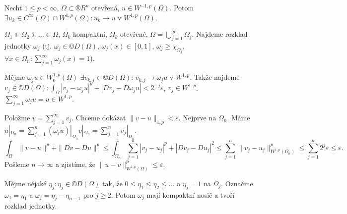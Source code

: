 \documentclass[12pt]{article}					%
\begin{document}
\begin{veta}
	Nechť $1 ≤ p < ∞$, $Ω \subset ®R^n$ otevřená, $u \in W^{-1, p}(Ω)$. Potom $\exists u_k \in C^∞(Ω) \cap W^{1, p}(Ω): u_k \rightarrow u$ v $W^{1, p}(Ω)$.

	\begin{dukazin}
		$Ω_1 \Subset Ω_2 \Subset … \Subset Ω$, $\overline{Ω_k}$ kompaktní, $Ω_k$ otevřené, $Ω = \bigcup_{j=1}^∞ Ω_j$. Najdeme rozklad jednotky $ω_j$ (tj. $ω_j \in ©D(Ω)$, $ω_j(x) \in [0, 1]$, $ω_j ≥ χ_{Ω_j}$, $\forall x \in Ω_n: \sum_{j=1}^∞ ω_j(x) = 1$).

		Mějme $ω_ju \in W^{1, p}_0(Ω)$ $\exists v_{k, j} \in ©D(Ω)$: $v_{k, j} \rightarrow ω_j u$ v $W^{1, p}$. Takže najdeme $v_j \in ©D(Ω): \int_Ω |v_j - ω_j u|^p + |Dv_j - Dω_j u| < 2^{-j} ε$, $v_j \in W^{1, p}$. $\sum_{j=1}^∞ ω_j u = u \in W^{1, p}$.

		Položme $v = \sum_{j=1}^∞ v_j$. Chceme dokázat $\|v - u\|_{1, p} < ε$. Nejprve na $Ω_n$. Máme $u|_{Ω_n} = \sum_{j=1}^n (ω_j u) |_{Ω_n} v|_{Ω_n}  = \sum_{j=1}^n v_j|_{Ω_n}$.
		$$ \!\!\!\int_Ω \|v - u\|^p + \|Dv - Du\|^p ≤ \int_{Ω_n} \sum_{j=1}^n |v_j - u_j|^p + |Dv_j - Du_j|^2 ≤ \sum_{j=1}^n \|v_j - u_j\|_{W^{1, p}(Ω_n)}^p ≤ \sum_{j=1}^n 2^j ε ≤ ε.\!\! $$
		Pošleme $n \rightarrow ∞$ a zjistíme, že $\|u - v\|_{W^{1, p}(Ω)}^p ≤ ε$.
	\end{dukazin}

	\begin{poznamkain}
		Mějme nějaké $η_j: η_j \in ©D(Ω)$ tak, že $0 ≤ η_1 ≤ η_2 ≤ …$ a $η_j = 1$ na $Ω_j$. Označme $ω_1 = η_1$ a $ω_j = η_j - η_{n-1}$ pro $j ≥ 2$. Potom $ω_j$ mají kompaktní nosič a tvoří rozklad jednotky.
	\end{poznamkain}
\end{veta}
\end{document}
